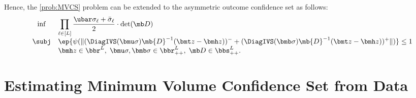 \documentclass[opre, blindrev]{informs4}
\newcommand{\1}[1]{\mathds{1}{\left(#1\right)}}
\begin{document}
Hence, the \ref{prob:MVCS} problem can be extended to the asymmetric outcome confidence set as follows:
\[
\begin{array}{cll}
\inf & \displaystyle \prod_{\ell \in [L]} \frac{\ubar \sigma_{\ell} + \bar \sigma_{\ell}}{2} \cdot \det(\mb D) \\
\subj & \displaystyle\ep{\psi(\|(\DiagIVS(\bmu \sigma) \mb{D}^{-1} (\bmt z - \bmh z))^- + (\DiagIVS(\bmb \sigma) \mb{D}^{-1} (\bmt z - \bmh z))^+ \|)} \leq 1 \\
& \bmh z \in \bbr^L, \; \bmu \sigma,\bmb \sigma \in \bbr^L_{++}, \; \mb D \in \bbs^L_{++}.  
\end{array} 
\]

\section{Estimating Minimum Volume Confidence Set from Data}
\label{sec:MVCSEfromData}
\end{document}
